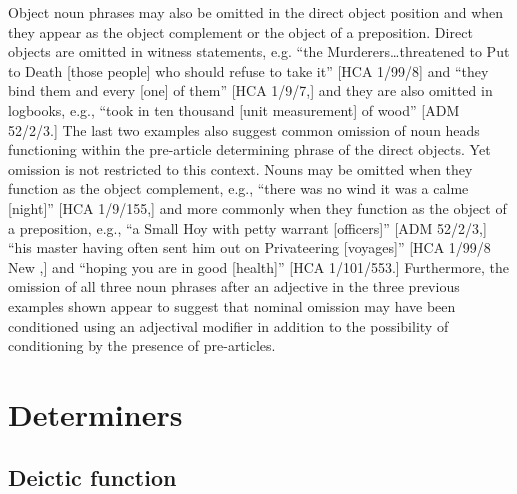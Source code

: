 Object noun phrases may also be omitted in the direct object position and when they appear as the object complement or the object of a preposition. Direct objects are omitted in witness statements, e.g. “the Murderers…threatened to Put to Death [those people] who should refuse to take it” [HCA 1/99/8] and “they bind them and every [one] of them” [HCA 1/9/7,] and they are also omitted in logbooks, e.g., “took in ten thousand [unit measurement] of wood” [ADM 52/2/3.] The last two examples also suggest common omission of noun heads functioning within the pre-article determining phrase of the direct objects. Yet omission is not restricted to this context. Nouns may be omitted when they function as the object complement, e.g., “there was no wind it was a calme [night]” [HCA 1/9/155,] and more commonly when they function as the object of a preposition, e.g., “a Small Hoy with petty warrant [officers]” [ADM 52/2/3,] “his master having often sent him out on Privateering [voyages]” [HCA 1/99/8 New \citealt{Providence1722},] and “hoping you are in good [health]” [HCA 1/101/553.] Furthermore, the omission of all three noun phrases after an adjective in the three previous examples shown appear to suggest that nominal omission may have been conditioned using an adjectival modifier in addition to the possibility of conditioning by the presence of pre-articles. 

\section{\textbf{Determiners}}%

\subsection{\textbf{Deictic} \textbf{function}}%


